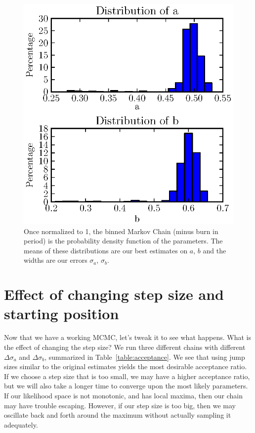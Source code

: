 \documentclass[iop,floatfix]{emulateapj}
\begin{document}
\begin{figure}
\begin{center}
  \includegraphics{hist_param}
  \caption{Once normalized to 1, the binned Markov Chain (minus burn in period) is the probability density function of the parameters. The means of these distributions are our best estimates on $a$, $b$ and the widths are our errors $\sigma_a$, $\sigma_b$.}
\label{fig:hist_param}
\end{center}
\end{figure}

\section{Effect of changing step size and starting position}

Now that we have a working MCMC, let's tweak it to see what happens. What is the effect of changing the step size? We run three different chains with different $\Delta\sigma_a$ and $\Delta\sigma_b$, summarized in Table~\ref{table:acceptance}. We see that using jump sizes similar to the original estimates yields the most desirable acceptance ratio. If we choose a step size that is too small, we may have a higher acceptance ratio, but we will also take a longer time to converge upon the most likely parameters. If our likelihood space is not monotonic, and has local maxima, then our chain may have trouble escaping. However, if our step size is too big, then we may oscillate back and forth around the maximum without actually sampling it adequately.
\end{document}
